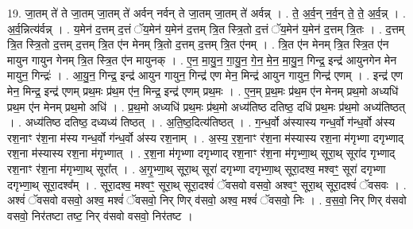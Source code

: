 \documentclass[17pt]{extarticle}
\begin{document}
19. जा॒तम् ते॑ ते जा॒तम् जा॒तम् ते॑ अर्वन् नर्वन् ते जा॒तम् जा॒तम् ते॑ अर्वन्न् । . ते॒ अ॒र्व॒न् न॒र्व॒न् ते॒ ते॒ अ॒र्व॒न्न् । . अ॒र्व॒न्नित्य॑र्वन्न् । . य॒मेन॑ द॒त्तम् द॒त्तं ॅय॒मेन॑ य॒मेन॑ द॒त्तम् त्रि॒त स्त्रि॒तो द॒त्तं ॅय॒मेन॑ य॒मेन॑ द॒त्तम् त्रि॒तः । . द॒त्तम् त्रि॒त स्त्रि॒तो द॒त्तम् द॒त्तम् त्रि॒त ए॑न मेनम् त्रि॒तो द॒त्तम् द॒त्तम् त्रि॒त ए॑नम् । . त्रि॒त ए॑न मेनम् त्रि॒त स्त्रि॒त ए॑न मायुन गायुन गेनम् त्रि॒त स्त्रि॒त ए॑न मायुनक् । . ए॒न॒ मा॒यु॒न॒ गा॒यु॒न॒ गे॒न॒ मे॒न॒ मा॒यु॒न॒ गिन्द्र॒ इन्द्र॑ आयुनगेन मेन मायुन॒ गिन्द्रः॑ । . आ॒यु॒न॒ गिन्द्र॒ इन्द्र॑ आयुन गायुन॒ गिन्द्र॑ एण मेन॒ मिन्द्र॑ आयुन गायुन॒ गिन्द्र॑ एणम् । . इन्द्र॑ एण मेन॒ मिन्द्र॒ इन्द्र॑ एणम् प्रथ॒मः प्र॑थ॒म ए॑न॒ मिन्द्र॒ इन्द्र॑ एणम् प्रथ॒मः । . ए॒न॒म् प्र॒थ॒मः प्र॑थ॒म ए॑न मेनम् प्रथ॒मो अध्यधि॑ प्रथ॒म ए॑न मेनम् प्रथ॒मो अधि॑ । . प्र॒थ॒मो अध्यधि॑ प्रथ॒मः प्र॑थ॒मो अध्य॑तिष्ठ दतिष्ठ॒ दधि॑ प्रथ॒मः प्र॑थ॒मो अध्य॑तिष्ठत् । . अध्य॑तिष्ठ दतिष्ठ॒ दध्यध्य॑ तिष्ठत् । . अ॒ति॒ष्ठ॒दित्य॑तिष्ठत् । . ग॒न्ध॒र्वो अ॑स्यास्य गन्ध॒र्वो ग॑न्ध॒र्वो अ॑स्य रश॒नाꣳ र॑श॒ना म॑स्य गन्ध॒र्वो ग॑न्ध॒र्वो अ॑स्य रश॒नाम् । . अ॒स्य॒ र॒श॒नाꣳ र॑श॒ना म॑स्यास्य रश॒ना म॑गृभ्णा दगृभ्णाद् रश॒ना म॑स्यास्य रश॒ना म॑गृभ्णात् । . र॒श॒ना म॑गृभ्णा दगृभ्णाद् रश॒नाꣳ र॑श॒ना म॑गृभ्णा॒थ् सूरा॒थ् सूरा॑द गृभ्णाद् रश॒नाꣳ र॑श॒ना म॑गृभ्णा॒थ् सूरा᳚त् । . अ॒गृ॒भ्णा॒थ् सूरा॒थ् सूरा॑ दगृभ्णा दगृभ्णा॒थ् सूरा॒दश्व॒ मश्वꣳ॒॒ सूरा॑ दगृभ्णा दगृभ्णा॒थ् सूरा॒दश्व᳚म् । . सूरा॒दश्व॒ मश्वꣳ॒॒ सूरा॒थ् सूरा॒दश्वं॑ ॅवसवो वसवो॒ अश्वꣳ॒॒ सूरा॒थ् सूरा॒दश्वं॑ ॅवसवः । . अश्वं॑ ॅवसवो वसवो॒ अश्व॒ मश्वं॑ ॅवसवो॒ निर् णिर् व॑सवो॒ अश्व॒ मश्वं॑ ॅवसवो॒ निः । . व॒स॒वो॒ निर् णिर् व॑सवो वसवो॒ निर॑तष्टा तष्ट॒ निर् व॑सवो वसवो॒ निर॑तष्ट । \newline
\end{document}
